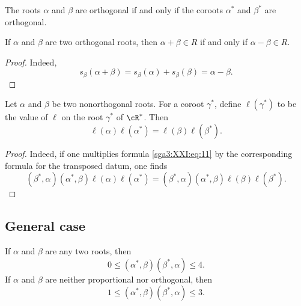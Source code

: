\begin{remark}\label{sga3:XXI:2.2.4}
The roots \(\alpha\) and \(\beta\) are orthogonal if and only if the
coroots \(\alpha^\ast\) and \(\beta^\ast\) are orthogonal.
\end{remark}

\begin{lemma}\label{sga3:XXI:2.2.5}
If \(\alpha\) and \(\beta\) are two orthogonal roots, then
\(\alpha+\beta\in R\) if and only if \(\alpha-\beta\in R\).
\end{lemma}

\begin{proof}
Indeed,
\[
 s_\beta(\alpha+\beta)
 =s_\beta(\alpha)+s_\beta(\beta)=\alpha-\beta.
\]
\end{proof}

\begin{lemma}\label{sga3:XXI:2.2.6}
Let \(\alpha\) and \(\beta\) be two nonorthogonal roots. For a coroot
\(\gamma^\ast\), define \(\ell(\gamma^\ast)\) to be the value of
\(\ell\) on the root \(\gamma^\ast\) of \(\cR^\ast\). Then
\begin{equation}
 \ell(\alpha)\ell(\alpha^\ast)
 =\ell(\beta)\ell(\beta^\ast).
 \tag{12}\label{sga3:XXI:eq:12}
\end{equation}
\end{lemma}

\begin{proof}
Indeed, if one multiplies formula \eqref{sga3:XXI:eq:11} by the
corresponding formula for the transposed datum, one finds
\[
 (\beta^\ast,\alpha)(\alpha^\ast,\beta)
 \ell(\alpha)\ell(\alpha^\ast)
 =
 (\beta^\ast,\alpha)(\alpha^\ast,\beta)
 \ell(\beta)\ell(\beta^\ast).
\]
\end{proof}

\subsection{General case}

\begin{proposition}\label{sga3:XXI:2.3.1}
If \(\alpha\) and \(\beta\) are any two roots, then
\begin{equation}
 0\leq(\alpha^\ast,\beta)(\beta^\ast,\alpha)\leq4.
 \tag{13}\label{sga3:XXI:eq:13}
\end{equation}
If \(\alpha\) and \(\beta\) are neither proportional nor orthogonal,
then
\[
 1\leq(\alpha^\ast,\beta)(\beta^\ast,\alpha)\leq3.
\]
\end{proposition}


